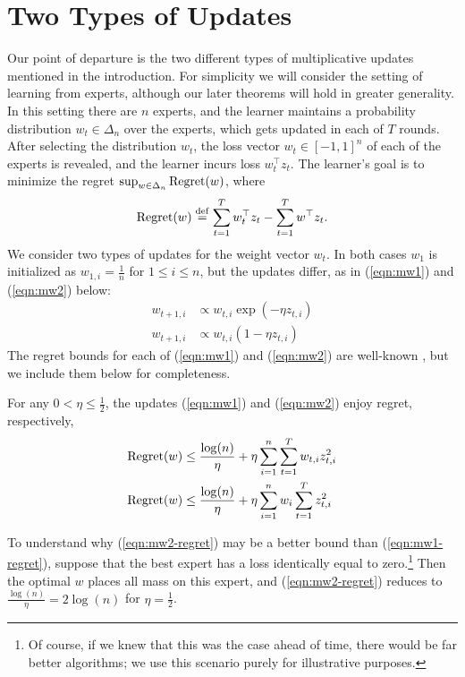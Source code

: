\documentclass[paper_icml.tex]{subfiles}
\begin{document}
\section{Two Types of Updates} 
\label{sec:mw12}
Our point of departure is the two different types of multiplicative updates 
mentioned in the introduction. For simplicity we will consider the setting of 
learning from experts, although our later theorems will hold in greater 
generality. In this setting there are $n$ experts, and the learner maintains a 
probability distribution $w_t \in \Delta_n$ over the experts, which gets 
updated in each of $T$ rounds. After selecting the distribution $w_t$, 
the loss vector $w_t \in [-1,1]^n$ of each of the experts is revealed, and the 
learner incurs loss $w_t^{\top}z_t$. The learner's goal is to minimize 
the regret $\sup_{w \in \Delta_n} \operatorname{Regret}(w)$, where
\[ \operatorname{Regret}(w) \stackrel{\mathrm{def}}{=} \sum_{t=1}^T w_t^{\top}z_t - \sum_{t=1}^T w^{\top}z_t. \]
We consider two types of updates for the weight vector $w_t$. In both cases 
$w_1$ is initialized as $w_{1,i} = \frac{1}{n}$ for $1 \leq i \leq n$, but 
the updates differ, as in (\ref{eqn:mw1}) and (\ref{eqn:mw2}) below:
\begin{align}
\label{eqn:mw1}
w_{t+1,i} &\propto w_{t,i}\exp(-\eta z_{t,i}) \tag{MW1}\\
\label{eqn:mw2}
w_{t+1,i} &\propto w_{t,i}(1-\eta z_{t,i}) \tag{MW2}
\end{align}
The regret bounds for each of (\ref{eqn:mw1}) and (\ref{eqn:mw2}) are 
well-known \cite{shalev2011, cesa2007}, but we include them below for completeness.
\begin{theorem}
\label{thm:mw12}
For any $0 < \eta \leq \frac{1}{2}$, the updates (\ref{eqn:mw1}) and 
(\ref{eqn:mw2}) enjoy regret, respectively,
\begin{align}
\label{eqn:mw1-regret}
\Regret(w) &\leq \frac{\log(n)}{\eta} + \eta \sum_{i=1}^n \sum_{t=1}^T w_{t,i}z_{t,i}^2 %
 \\
\label{eqn:mw2-regret}
\Regret(w) &\leq \frac{\log(n)}{\eta} + \eta \sum_{i=1}^n w_i \sum_{t=1}^T z_{t,i}^2 %
\end{align}
\end{theorem}
To understand why (\ref{eqn:mw2-regret}) may be a better bound than 
(\ref{eqn:mw1-regret}), suppose that the best expert has a loss identically 
equal to zero.\footnote{Of course, if we knew that this was the case ahead of 
time, there would be far better algorithms; we use this scenario purely for 
illustrative purposes.} Then the optimal $w$ places all mass on this expert, 
and (\ref{eqn:mw2-regret}) reduces to $\frac{\log(n)}{\eta} = 2\log(n)$ for 
$\eta = \frac{1}{2}$.
\end{document}
